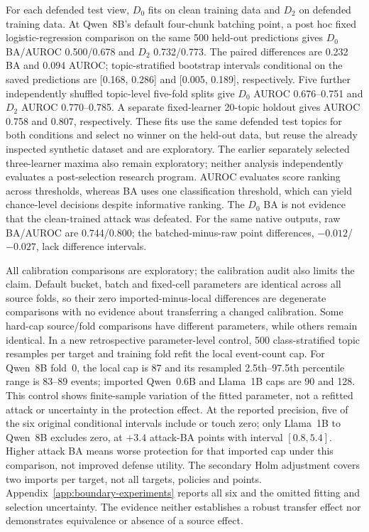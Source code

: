 For each defended test view, $D_0$ fits on clean training data and $D_2$ on defended training data. At Qwen~8B's default four-chunk batching point, a post hoc fixed logistic-regression comparison on the same 500 held-out predictions gives $D_0$ BA/AUROC 0.500/0.678 and $D_2$ 0.732/0.773. The paired differences are 0.232 BA and 0.094 AUROC; topic-stratified bootstrap intervals conditional on the saved predictions are [0.168, 0.286] and [0.005, 0.189], respectively. Five further independently shuffled topic-level five-fold splits give $D_0$ AUROC 0.676--0.751 and $D_2$ AUROC 0.770--0.785. A separate fixed-learner 20-topic holdout gives AUROC 0.758 and 0.807, respectively. These fits use the same defended test topics for both conditions and select no winner on the held-out data, but reuse the already inspected synthetic dataset and are exploratory. The earlier separately selected three-learner maxima also remain exploratory; neither analysis independently evaluates a post-selection research program. AUROC evaluates score ranking across thresholds, whereas BA uses one classification threshold, which can yield chance-level decisions despite informative ranking. The $D_0$ BA is not evidence that the clean-trained attack was defeated. For the same native outputs, raw BA/AUROC are 0.744/0.800; the batched-minus-raw point differences, $-0.012$/$-0.027$, lack difference intervals.

All calibration comparisons are exploratory; the calibration audit also limits the claim. Default bucket, batch and fixed-cell parameters are identical across all source folds, so their zero imported-minus-local differences are degenerate comparisons with no evidence about transferring a changed calibration. Some hard-cap source/fold comparisons have different parameters, while others remain identical. In a new retrospective parameter-level control, 500 class-stratified topic resamples per target and training fold refit the local event-count cap. For Qwen~8B fold~0, the local cap is 87 and its resampled 2.5th--97.5th percentile range is 83--89 events; imported Qwen~0.6B and Llama~1B caps are 90 and 128. This control shows finite-sample variation of the fitted parameter, not a refitted attack or uncertainty in the protection effect. At the reported precision, five of the six original conditional intervals include or touch zero; only Llama~1B to Qwen~8B excludes zero, at $+3.4$ attack-BA points with interval $[0.8,5.4]$. Higher attack BA means worse protection for that imported cap under this comparison, not improved defense utility. The secondary Holm adjustment covers two imports per target, not all targets, policies and points. Appendix~\ref{app:boundary-experiments} reports all six and the omitted fitting and selection uncertainty. The evidence neither establishes a robust transfer effect nor demonstrates equivalence or absence of a source effect.

